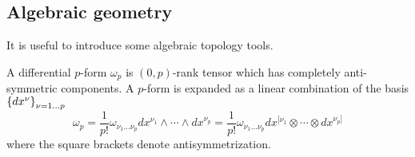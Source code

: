 %
%
%
%
%
%


\subsection{Algebraic geometry}

It is useful to introduce some algebraic topology tools.

A differential $p$-form $\omega_p$ is $(0,p)$-rank tensor which has completely anti-symmetric components.
A $p$-form is expanded as a linear combination of the basis $\qty{dx^\nu}_{\nu=1\ldots p}$ 
\begin{equation}
  \omega_p =\frac{1}{p!} \omega_{\nu_1\ldots\nu_p}dx^{\nu_1}\wedge \cdots  \wedge dx^{\nu_p} =
\frac{1}{p!} \omega_{\nu_1\ldots\nu_p}dx^{[ \nu_1}\otimes \cdots  \otimes dx^{\nu_p]}
\end{equation}
where the square brackets denote antisymmetrization.

